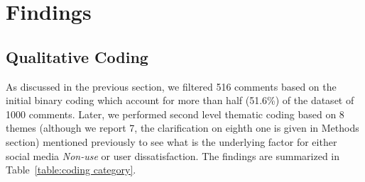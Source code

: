 \section{Findings}
\label{sec:findings}

\subsection{Qualitative Coding}

As discussed in the previous section, we filtered 516 comments based on the initial binary coding which account for more than half (51.6\%) of the dataset of 1000 comments. Later, we performed second level thematic coding based on 8 themes (although we report 7, the clarification on eighth one is given in Methods section) mentioned previously to see what is the underlying factor for either social media \textit{Non-use} or user dissatisfaction. The findings are summarized in Table~\ref{table:coding category}.


